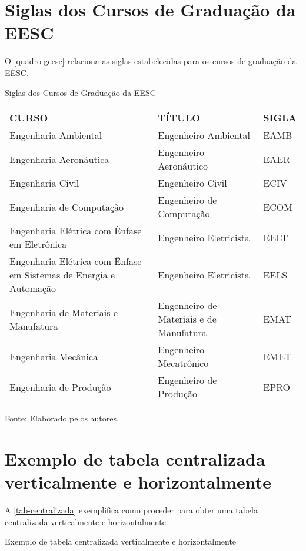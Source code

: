 \begin{apendicesenv}
\chapter{Siglas dos Cursos de Graduação da EESC}
O \autoref{quadro-geesc} relaciona as siglas estabelecidas para os cursos de graduação da EESC.
\begin{quadro}[htb]
	\ABNTEXfontereduzida
	\caption[Siglas dos Cursos de Graduação da EESC]{Siglas dos Cursos de Graduação da EESC}
	\label{quadro-geesc}
	\begin{tabular}{|p{6.5cm}|p{6.5cm}|p{1.75cm}|}
		\hline
		\textbf{CURSO} & \textbf{TÍTULO} &  \textbf{SIGLA}  \\
		\hline
		Engenharia Ambiental & Engenheiro Ambiental & EAMB\\
		Engenharia Aeronáutica & Engenheiro Aeronáutico & EAER\\
		Engenharia Civil & Engenheiro Civil & ECIV\\
		Engenharia de Computação & Engenheiro de Computação & ECOM\\
	    Engenharia Elétrica com Ênfase em Eletrônica & Engenheiro Eletricista & EELT\\
	    Engenharia Elétrica com Ênfase em Sistemas de Energia e Automação & Engenheiro Eletricista & EELS\\
		Engenharia de Materiais e Manufatura & Engenheiro de Materiais e de Manufatura & EMAT\\
		Engenharia Mecânica & Engenheiro Mecatrônico & EMET\\
		Engenharia de Produção & Engenheiro de Produção & EPRO\\
		\hline
		
	\end{tabular}
	\begin{flushleft}
		Fonte: Elaborado pelos autores.\
	\end{flushleft}
\end{quadro}

\chapter{Exemplo de tabela centralizada verticalmente e horizontalmente}
\index{tabelas}A \autoref{tab-centralizada} exemplifica como proceder para obter uma tabela centralizada verticalmente e horizontalmente.
\begin{table}[htb]
\ABNTEXfontereduzida
\caption[Exemplo de tabela centralizada verticalmente e horizontalmente]{Exemplo de tabela centralizada verticalmente e horizontalmente}
\label{tab-centralizada}


\end{table}
\end{apendicesenv}

